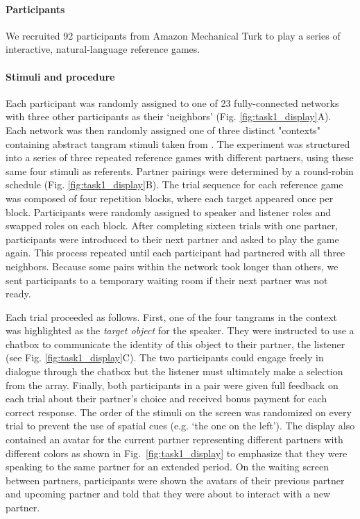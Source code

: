 \paragraph{Participants}

We recruited 92 participants from Amazon Mechanical Turk to play a series of interactive, natural-language reference games. 

\paragraph{Stimuli and procedure}

Each participant was randomly assigned to one of 23 fully-connected networks with three other participants as their `neighbors' (Fig. \ref{fig:task1_display}A). 
Each network was then randomly assigned one of three distinct "contexts" containing abstract tangram stimuli taken from \cite{ClarkWilkesGibbs86_ReferringCollaborative}.
The experiment was structured into a series of three repeated reference games with different partners, using these same four stimuli as referents.
Partner pairings were determined by a round-robin schedule (Fig. \ref{fig:task1_display}B).
The trial sequence for each reference game was composed of four repetition blocks, where each target appeared once per block.
Participants were randomly assigned to speaker and listener roles and swapped roles on each block.
After completing sixteen trials with one partner, participants were introduced to their next partner and asked to play the game again. 
This process repeated until each participant had partnered with all three neighbors.
Because some pairs within the network took longer than others, we sent participants to a temporary waiting room if their next partner was not ready. 

Each trial proceeded as follows.
First, one of the four tangrams in the context was highlighted as the \emph{target object} for the speaker.
They were instructed to use a chatbox to communicate the identity of this object to their partner, the listener (see Fig. \ref{fig:task1_display}C).
The two participants could engage freely in dialogue through the chatbox but the listener must ultimately make a selection from the array. 
Finally, both participants in a pair were given full feedback on each trial about their partner's choice and received bonus payment for each correct response. 
The order of the stimuli on the screen was randomized on every trial to prevent the use of spatial cues (e.g. `the one on the left').
The display also contained an avatar for the current partner  representing different partners with different colors as shown in Fig.~\ref{fig:task1_display} to emphasize that they were speaking to the same partner for an extended period.
On the waiting screen between partners, participants were shown the avatars of their previous partner and upcoming partner and told that they were about to interact with a new partner.

